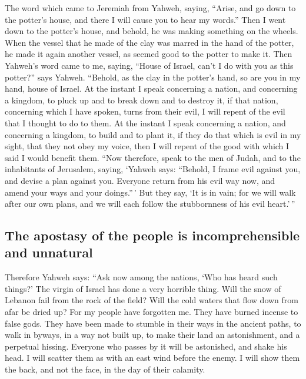  The word which came to Jeremiah from Yahweh, saying,
 ``Arise, and go down to the potter's house, and there I
will cause you to hear my words.''  Then I went down to
the potter's house, and behold, he was making something on the wheels.
 When the vessel that he made of the clay was marred in
the hand of the potter, he made it again another vessel, as seemed good
to the potter to make it.  Then Yahweh's word came to me,
saying,  ``House of Israel, can't I do with you as this
potter?'' says Yahweh. ``Behold, as the clay in the potter's hand, so
are you in my hand, house of Israel.  At the instant I
speak concerning a nation, and concerning a kingdom, to pluck up and to
break down and to destroy it,  if that nation, concerning
which I have spoken, turns from their evil, I will repent of the evil
that I thought to do to them.  At the instant I speak
concerning a nation, and concerning a kingdom, to build and to plant it,
 if they do that which is evil in my sight, that they not
obey my voice, then I will repent of the good with which I said I would
benefit them.  ``Now therefore, speak to the men of
Judah, and to the inhabitants of Jerusalem, saying, `Yahweh says:
``Behold, I frame evil against you, and devise a plan against you.
Everyone return from his evil way now, and amend your ways and your
doings.''\,'  But they say, `It is in vain; for we will
walk after our own plans, and we will each follow the stubbornness of
his evil heart.'\,''

\hypertarget{the-apostasy-of-the-people-is-incomprehensible-and-unnatural}{%
\subsection{The apostasy of the people is incomprehensible and
unnatural}\label{the-apostasy-of-the-people-is-incomprehensible-and-unnatural}}

 Therefore Yahweh says: ``Ask now among the nations, `Who
has heard such things?' The virgin of Israel has done a very horrible
thing.  Will the snow of Lebanon fail from the rock of
the field? Will the cold waters that flow down from afar be dried up?
 For my people have forgotten me. They have burned
incense to false gods. They have been made to stumble in their ways in
the ancient paths, to walk in byways, in a way not built up,
 to make their land an astonishment, and a perpetual
hissing. Everyone who passes by it will be astonished, and shake his
head.  I will scatter them as with an east wind before
the enemy. I will show them the back, and not the face, in the day of
their calamity.

